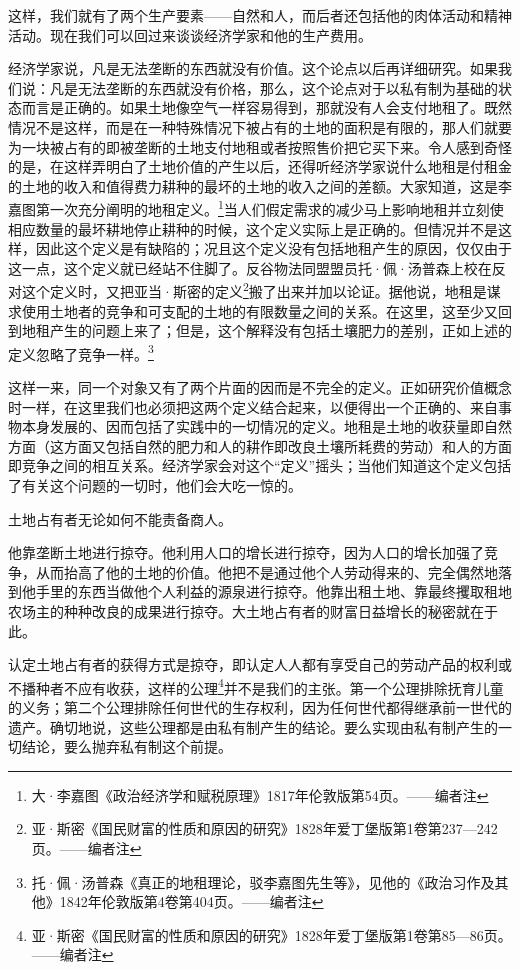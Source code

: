 \documentclass[a4paper,twoside,12pt]{ctexart}
\begin{document}
这样，我们就有了两个生产要素——自然和人，而后者还包括他的肉体活动和精神活动。现在我们可以回过来谈谈经济学家和他的生产费用。

经济学家说，凡是无法垄断的东西就没有价值。这个论点以后再详细研究。如果我们说：凡是无法垄断的东西就没有价格，那么，这个论点对于以私有制为基础的状态而言是正确的。如果土地像空气一样容易得到，那就没有人会支付地租了。既然情况不是这样，而是在一种特殊情况下被占有的土地的面积是有限的，那人们就要为一块被占有的即被垄断的土地支付地租或者按照售价把它买下来。令人感到奇怪的是，在这样弄明白了土地价值的产生以后，还得听经济学家说什么地租是付租金的土地的收入和值得费力耕种的最坏的土地的收入之间的差额。大家知道，这是李嘉图第一次充分阐明的地租定义。\footnote{大·李嘉图《政治经济学和赋税原理》1817年伦敦版第54页。——编者注}当人们假定需求的减少马上影响地租并立刻使相应数量的最坏耕地停止耕种的时候，这个定义实际上是正确的。但情况并不是这样，因此这个定义是有缺陷的；况且这个定义没有包括地租产生的原因，仅仅由于这一点，这个定义就已经站不住脚了。反谷物法同盟盟员托·佩·汤普森上校在反对这个定义时，又把亚当·斯密的定义\footnote{亚·斯密《国民财富的性质和原因的研究》1828年爱丁堡版第1卷第237—242页。——编者注}搬了出来并加以论证。据他说，地租是谋求使用土地者的竞争和可支配的土地的有限数量之间的关系。在这里，这至少又回到地租产生的问题上来了；但是，这个解释没有包括土壤肥力的差别，正如上述的定义忽略了竞争一样。\footnote{托·佩·汤普森《真正的地租理论，驳李嘉图先生等》，见他的《政治习作及其他》1842年伦敦版第4卷第404页。——编者注}

这样一来，同一个对象又有了两个片面的因而是不完全的定义。正如研究价值概念时一样，在这里我们也必须把这两个定义结合起来，以便得出一个正确的、来自事物本身发展的、因而包括了实践中的一切情况的定义。地租是土地的收获量即自然方面（这方面又包括自然的肥力和人的耕作即改良土壤所耗费的劳动）和人的方面即竞争之间的相互关系。经济学家会对这个“定义”摇头；当他们知道这个定义包括了有关这个问题的一切时，他们会大吃一惊的。

土地占有者无论如何不能责备商人。

他靠垄断土地进行掠夺。他利用人口的增长进行掠夺，因为人口的增长加强了竞争，从而抬高了他的土地的价值。他把不是通过他个人劳动得来的、完全偶然地落到他手里的东西当做他个人利益的源泉进行掠夺。他靠出租土地、靠最终攫取租地农场主的种种改良的成果进行掠夺。大土地占有者的财富日益增长的秘密就在于此。

认定土地占有者的获得方式是掠夺，即认定人人都有享受自己的劳动产品的权利或不播种者不应有收获，这样的公理\footnote{亚·斯密《国民财富的性质和原因的研究》1828年爱丁堡版第1卷第85—86页。——编者注}并不是我们的主张。第一个公理排除抚育儿童的义务；第二个公理排除任何世代的生存权利，因为任何世代都得继承前一世代的遗产。确切地说，这些公理都是由私有制产生的结论。要么实现由私有制产生的一切结论，要么抛弃私有制这个前提。
\end{document}
